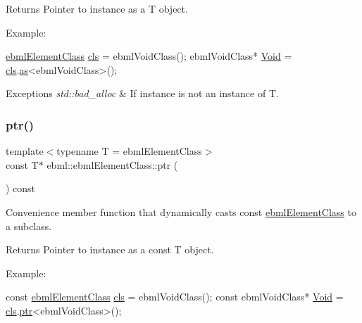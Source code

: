 \begin{DoxyReturn}{Returns}
Pointer to instance as a T object.
\end{DoxyReturn}
Example\+: 
\begin{DoxyCode}
\mbox{\hyperlink{classebml_1_1ebmlElementClass_a6c2081870c5d66c70e0cf988ff253420}{ebmlElementClass}} \mbox{\hyperlink{classebml_1_1ebmlElement_a15cf59e94b01e2c49ec96512b9bd9d90}{cls}} = ebmlVoidClass();
ebmlVoidClass* \mbox{\hyperlink{namespaceebml_afbfd509d1cb71e416a07253746e886e9}{Void}} = \mbox{\hyperlink{classebml_1_1ebmlElement_a15cf59e94b01e2c49ec96512b9bd9d90}{cls}}.\mbox{\hyperlink{classebml_1_1ebmlElementClass_ab8c68b1f0a25aead5003d7100a27d5d3}{as}}<ebmlVoidClass>();
\end{DoxyCode}
 
\begin{DoxyExceptions}{Exceptions}
{\em std\+::bad\+\_\+alloc} & If instance is not an instance of T. \\
\hline
\end{DoxyExceptions}
\mbox{\label{classebml_1_1ebmlElementClass_a4d3188e97ab01f1db0427faa5b5d6059}} 
\subsubsection{\texorpdfstring{ptr()}{ptr()}\hspace{0.1cm}{\footnotesize\ttfamily [2/2]}}
{\footnotesize\ttfamily template$<$typename T  = ebml\+Element\+Class$>$ \\
const T$\ast$ ebml\+::ebml\+Element\+Class\+::ptr (\begin{DoxyParamCaption}{ }\end{DoxyParamCaption}) const\hspace{0.3cm}{\ttfamily [inline]}}

Convenience member function that dynamically casts const \mbox{\hyperlink{classebml_1_1ebmlElementClass}{ebml\+Element\+Class}} to a subclass.

\begin{DoxyReturn}{Returns}
Pointer to instance as a const T object.
\end{DoxyReturn}
Example\+: 
\begin{DoxyCode}
\textcolor{keyword}{const} \mbox{\hyperlink{classebml_1_1ebmlElementClass_a6c2081870c5d66c70e0cf988ff253420}{ebmlElementClass}} \mbox{\hyperlink{classebml_1_1ebmlElement_a15cf59e94b01e2c49ec96512b9bd9d90}{cls}} = ebmlVoidClass();
\textcolor{keyword}{const} ebmlVoidClass* \mbox{\hyperlink{namespaceebml_afbfd509d1cb71e416a07253746e886e9}{Void}} = \mbox{\hyperlink{classebml_1_1ebmlElement_a15cf59e94b01e2c49ec96512b9bd9d90}{cls}}.\mbox{\hyperlink{classebml_1_1ebmlElementClass_a485c3f4a11b09d301b80f44e1802e9ab}{ptr}}<ebmlVoidClass>();
\end{DoxyCode}
 
